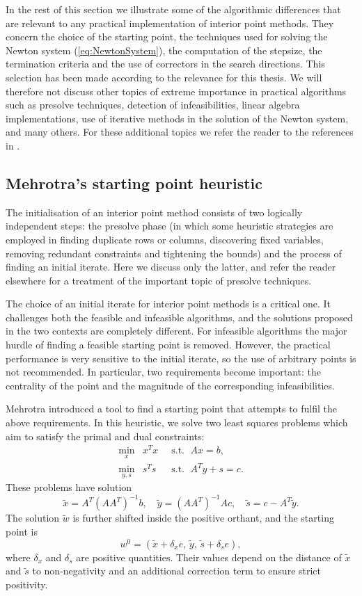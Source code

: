 In the rest of this section we illustrate some of 
the algorithmic differences that are relevant to any 
practical implementation of interior point methods.
They concern the choice of the starting point, the techniques
used for solving the Newton system (\ref{eq:NewtonSystem}), the computation
of the stepsize, the termination criteria and the use
of correctors in the search directions.
This selection has been made according to the relevance
for this thesis.
We will therefore not discuss other topics of extreme importance 
in practical algorithms such as presolve techniques, 
detection of infeasibilities, linear algebra implementations, 
use of iterative methods in the solution of the Newton system,
and many others.
For these additional topics we refer the reader to the references in 
\cite{AndersenGondzioMeszarosXu,GondzioTerlaky}.

%
%
\subsection{Mehrotra's starting point heuristic}
\label{sec:StartingPoint}

The initialisation of an interior point method consists of two
logically independent steps: the presolve phase (in which some
heuristic strategies are employed in finding duplicate rows or
columns, discovering fixed variables, removing redundant constraints 
and tightening the bounds)
and the process of finding an initial iterate.
Here we discuss only the latter, and refer the reader 
elsewhere
for a treatment of the important topic of presolve techniques.

The choice of an initial iterate for interior point methods is a
critical one. It challenges both the feasible and infeasible
algorithms, and the solutions proposed in the two contexts are
completely different.
For infeasible algorithms the major hurdle
of finding a feasible starting point is removed. 
However, the practical performance is very sensitive to the initial
iterate, so the use of arbitrary points is not recommended.
In particular, two requirements become important: the centrality 
of the point and the magnitude of the corresponding infeasibilities.

Mehrotra \cite{Mehrotra92} introduced a tool to find a starting point 
that attempts to fulfil the above requirements. In this
heuristic, we solve two least squares problems which aim to
satisfy the primal and dual constraints:
\begin{eqnarray*}
  \min_x    \!\! & x^Tx & \;\;\mbox{s.t. }\; Ax = b,      \\
  \min_{y,s}\!\! & s^Ts & \;\;\mbox{s.t. }\; A^Ty + s = c.
\end{eqnarray*}
These problems have solution
\[
  \tilde x = A^T(AA^T)^{-1}b, \quad
  \tilde y = (AA^T)^{-1}Ac, \quad
  \tilde s = c - A^T \tilde y.
\]
The solution $\tilde w$ is further 
shifted inside the positive orthant, and the starting point is
\[
  w^0 = (\tilde x + \delta_x e,\, \tilde y,\, \tilde s + \delta_s e),
\]
where $\delta_x$ and $\delta_s$ are positive quantities. 
Their values depend on the distance of $\tilde x$ and $\tilde s$
to non-negativity and an additional correction term to ensure
strict positivity.

